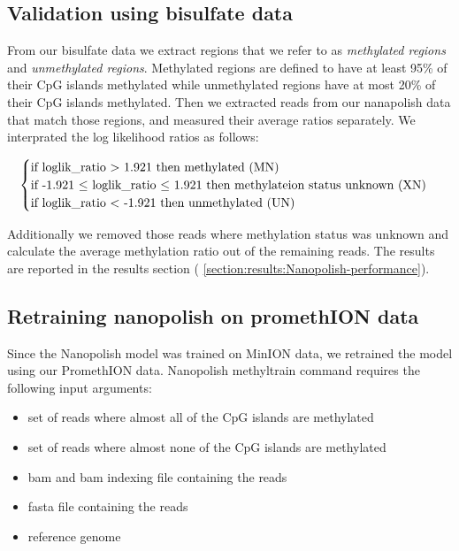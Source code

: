 \subsection{Validation using bisulfate data}
From our bisulfate data we extract regions that we refer to as \textit{methylated regions} and \textit{unmethylated regions}. Methylated regions are defined to have at least 95\% of their CpG islands methylated while unmethylated regions have at most 20\% of their CpG islands methylated. Then we extracted reads from our nanapolish data that match those regions, and measured their average ratios separately. We interprated the log likelihood ratios as follows:

\begin{equation*}
\centering
    \begin{cases}
    \text{if loglik\_ratio > 1.921 then methylated (MN)}\\
    \text{if -1.921 $\leq$ loglik\_ratio $\leq$ 1.921 then methylateion status unknown (XN)} \\ 
    \text{if loglik\_ratio < -1.921 then unmethylated (UN)} \\ 
    \end{cases}
\end{equation*}

Additionally we removed those reads where methylation status was unknown and calculate the average methylation ratio out of the remaining reads. The results are reported in the results section ( \ref{section:results:Nanopolish-performance}). 


\subsection{Retraining nanopolish on promethION data}
Since the Nanopolish model was trained on MinION data, we retrained the model using our PromethION data. Nanopolish methyltrain command requires the following input arguments:
\begin{itemize}
    \item set of reads where almost all of the CpG islands are methylated
    \item set of reads where almost none of the CpG islands are methylated
    \item bam and bam indexing file containing the reads
    \item fasta file containing the reads
    \item reference genome
\end{itemize}


